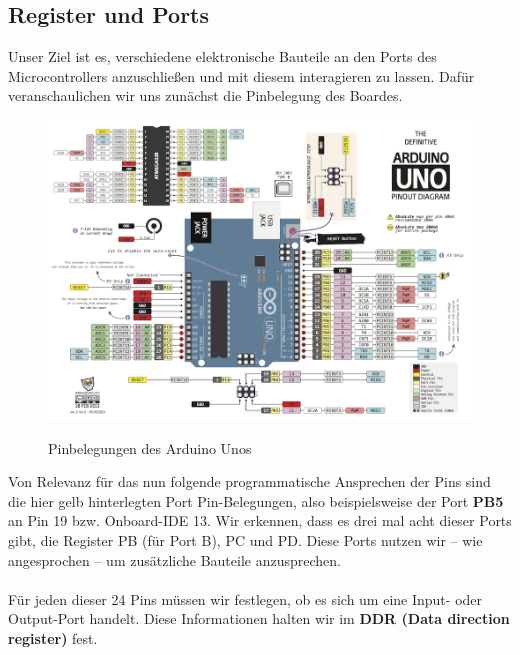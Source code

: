 \documentclass[11pt,a4paper]{scrartcl}
\begin{document}
\subsection{Register und Ports}
Unser Ziel ist es, verschiedene elektronische Bauteile an den Ports des Microcontrollers anzuschließen und mit diesem interagieren zu lassen. Dafür veranschaulichen wir uns zunächst die Pinbelegung des Boardes.
\begin{figure}[h!]
\centering
\includegraphics[scale=0.8]{pins.png}\label{pins}
\caption{Pinbelegungen des Arduino Unos}
\end{figure}
Von Relevanz für das nun folgende programmatische Ansprechen der Pins sind die hier gelb hinterlegten {\glqq}Port Pin{\grqq}-Belegungen, also beispielsweise der Port \textbf{PB5} an Pin 19 bzw. Onboard-IDE 13. Wir erkennen, dass es drei mal acht dieser Ports gibt, die Register PB (für Port B), PC und PD. Diese Ports nutzen wir -- wie angesprochen -- um zusätzliche Bauteile anzusprechen. \\\\
Für jeden dieser 24 Pins müssen wir festlegen, ob es sich um eine Input- oder Output-Port handelt. Diese Informationen halten wir im \textbf{DDR (Data direction register)} fest.
\end{document}
